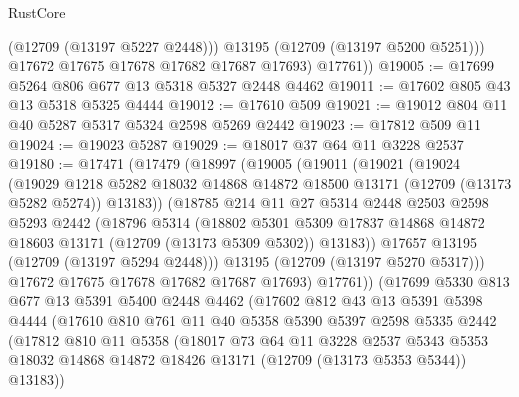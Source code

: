 \begin{lexlean}{RustCore}
\begin{coremodule}
              (@12709 (@13197 @5227 @2448)))
            @13195
            (@12709 (@13197 @5200 @5251)))
          @17672
          @17675
          @17678
          @17682
          @17687
          @17693)
        @17761))
@19005 := @17699 @5264 @806 @677 @13 @5318 @5327 @2448 @4462
@19011 := @17602 @805 @43 @13 @5318 @5325 @4444
@19012 := @17610 @509
@19021 := @19012 @804 @11 @40 @5287 @5317 @5324 @2598 @5269 @2442
@19023 := @17812 @509 @11
@19024 := @19023 @5287
@19029 := @18017 @37 @64 @11 @3228 @2537
@19180 := @17471
    (@17479
      (@18997
        (@19005
          (@19011
            (@19021
              (@19024
                (@19029
                  @1218
                  @5282
                  @18032
                  @14868
                  @14872
                  @18500
                  @13171
                  (@12709 (@13173 @5282 @5274))
                  @13183))
              (@18785
                @214
                @11
                @27
                @5314
                @2448
                @2503
                @2598
                @5293
                @2442
                (@18796
                  @5314
                  (@18802
                    @5301
                    @5309
                    @17837
                    @14868
                    @14872
                    @18603
                    @13171
                    (@12709 (@13173 @5309 @5302))
                    @13183))
                @17657
                @13195
                (@12709 (@13197 @5294 @2448)))
              @13195
              (@12709 (@13197 @5270 @5317)))
            @17672
            @17675
            @17678
            @17682
            @17687
            @17693)
          @17761))
      (@17699
        @5330
        @813
        @677
        @13
        @5391
        @5400
        @2448
        @4462
        (@17602
          @812
          @43
          @13
          @5391
          @5398
          @4444
          (@17610
            @810
            @761
            @11
            @40
            @5358
            @5390
            @5397
            @2598
            @5335
            @2442
            (@17812
              @810
              @11
              @5358
              (@18017
                @73
                @64
                @11
                @3228
                @2537
                @5343
                @5353
                @18032
                @14868
                @14872
                @18426
                @13171
                (@12709 (@13173 @5353 @5344))
                @13183))

\end{coremodule}
\end{lexlean}
